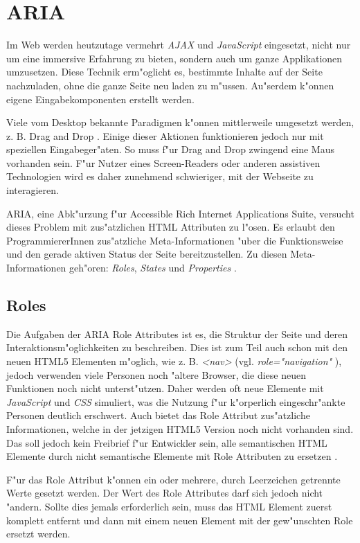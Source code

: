 \documentclass[a4paper,bibtotoc,oneside]{scrbook}
\begin{document}
\chapter{ARIA}
Im Web werden heutzutage vermehrt \emph{AJAX} und \emph{JavaScript} eingesetzt, nicht nur um eine immersive Erfahrung zu bieten, sondern auch um ganze Applikationen umzusetzen. Diese Technik erm"oglicht es, bestimmte Inhalte auf der Seite nachzuladen, ohne die ganze Seite neu laden zu m"ussen. Au"serdem k"onnen eigene Eingabekomponenten erstellt werden. \cite[S.26]{mod_software}

Viele vom Desktop bekannte Paradigmen k"onnen mittlerweile umgesetzt werden, z. B. \glqq Drag and Drop \grqq. Einige dieser Aktionen funktionieren jedoch nur mit speziellen Eingabeger"aten. So muss f"ur Drag and Drop zwingend eine Maus vorhanden sein. F"ur Nutzer eines Screen-Readers oder anderen assistiven Technologien wird es daher zunehmend schwieriger, mit der Webseite zu interagieren. \cite{aria_intro}

ARIA, eine Abk"urzung f"ur Accessible Rich Internet Applications Suite, versucht dieses Problem mit zus"atzlichen HTML Attributen zu l"osen. Es erlaubt den ProgrammiererInnen zus"atzliche Meta-Informationen "uber die Funktionsweise und den gerade aktiven Status der Seite bereitzustellen. Zu diesen Meta-Informationen geh"oren: \emph{Roles}, \emph{States} und \emph{Properties} \cite{aria_intro}. 


\section{Roles}
Die Aufgaben der ARIA Role Attributes ist es, die Struktur der Seite und deren Interaktionsm"oglichkeiten zu beschreiben. Dies ist zum Teil auch schon mit den neuen HTML5 Elementen m"oglich, wie z. B. \emph{<nav>} \cite[Abschnitt 4.4.3]{html5} (vgl. \emph{role="navigation"} \cite[Abschnitt 3.1]{xhtml_vocab}), jedoch verwenden viele Personen noch "altere Browser, die diese neuen Funktionen noch nicht unterst"utzen. Daher werden oft neue Elemente mit \emph{JavaScript} und \emph{CSS} simuliert, was die Nutzung f"ur k"orperlich eingeschr"ankte Personen deutlich erschwert. Auch bietet das Role Attribut zus"atzliche Informationen, welche in der jetzigen HTML5 Version noch nicht vorhanden sind\cite{html5}. Das soll jedoch kein Freibrief f"ur Entwickler sein, alle semantischen HTML Elemente durch nicht semantische Elemente mit Role Attributen zu ersetzen \cite[Abschnitt 3]{roles}. 

F"ur das Role Attribut k"onnen ein oder mehrere, durch Leerzeichen getrennte Werte gesetzt werden. Der Wert des Role Attributes darf sich jedoch nicht "andern. Sollte dies jemals erforderlich sein, muss das HTML Element zuerst komplett entfernt und dann mit einem neuen Element mit der gew"unschten Role ersetzt werden.\cite[Abschnitt 5]{aria_roles}
\end{document}
